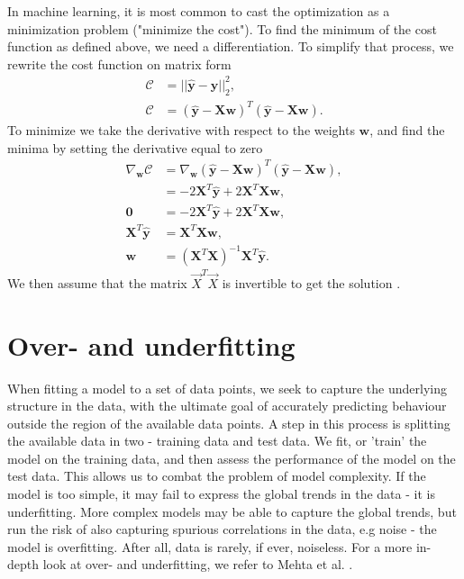 In machine learning, it is most common to cast the optimization as a minimization problem
("minimize the cost"). To find the minimum of the cost function as defined above, we need
a differentiation. To simplify that process, we rewrite the cost function on matrix form
\begin{align*}
\mathcal{C} &= || \boldsymbol{\hat{y}} - \boldsymbol{y} ||_2 ^2, \\
\mathcal{C} &= ( \boldsymbol{\hat{y}} - \boldsymbol{Xw})^T( \boldsymbol{\hat{y}} - \boldsymbol{Xw}).
\end{align*}
To minimize we take the derivative with respect to the weights $\boldsymbol{w}$,
and find the minima by setting the derivative equal to zero
\begin{align}
\nabla _{\boldsymbol{w}}\mathcal{C} &= \nabla _{\boldsymbol{w}} ( \boldsymbol{\hat{y}} - \boldsymbol{Xw})^T( \boldsymbol{\hat{y}} - \boldsymbol{Xw}), \\
&= -2\boldsymbol{X}^T\boldsymbol{\hat{y}} + 2\boldsymbol{X}^T\boldsymbol{X}\boldsymbol{w}, \\
\boldsymbol{0} &= -2\boldsymbol{X}^T\boldsymbol{\hat{y}} + 2\boldsymbol{X}^T\boldsymbol{X}\boldsymbol{w}, \\
\boldsymbol{X}^T\boldsymbol{\hat{y}} &= \boldsymbol{X}^T\boldsymbol{X}\boldsymbol{w}, \\
\boldsymbol{w} &=(\boldsymbol{X}^T\boldsymbol{X})^{-1} \boldsymbol{X}^T\boldsymbol{\hat{y}}. \label{eq:ols}
\end{align}
We then assume that the matrix \(\vec{X}^T\vec{X}\)
is invertible to get the solution \cite{James2000}.

\section{Over- and underfitting}\label{sec:overfitting}
When fitting a model to a set of data points, we seek to capture the underlying structure in the data,
with the ultimate goal of accurately predicting behaviour outside the region of the available data points.
A step in this process is splitting the available data in two - training data and test data. We fit, or 'train'
the model on the training data, and then assess the performance of the model on the test data. This allows us
to combat the problem of model complexity. If the model is too simple, it may fail to express the global trends 
in the data - it is underfitting. More complex models may be able to capture the global trends, but run the risk of 
also capturing spurious correlations in the data, e.g noise - the model is overfitting. After all, data is rarely,
if ever, noiseless. For a more in-depth look at over- and underfitting, we refer to Mehta et al. \cite{Mehta2019}.



